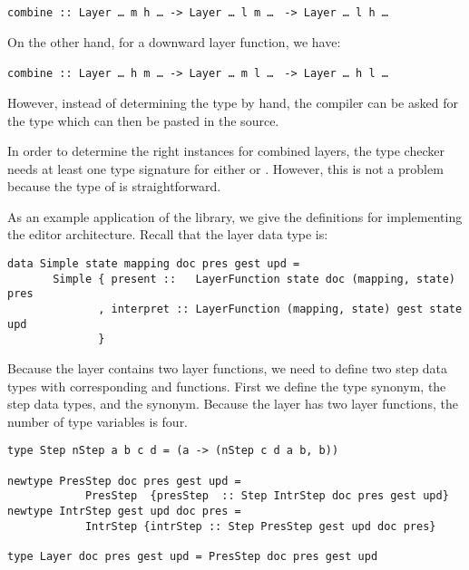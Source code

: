 \documentclass[preprint,natbib]{sigplanconf}
\begin{document}
\begin{small}
{\tt  combine :: Layer \dots~m h \dots}\verb| -> |{\tt Layer \dots~l m \dots} \verb| -> |{\tt Layer \dots~l h \dots}
\end{small}

On the other hand, for a downward layer function, we have:

\begin{small}
{\tt  combine :: Layer \dots~h m \dots}\verb| -> |{\tt Layer \dots~m l \dots} \verb| -> |{\tt Layer \dots~h l \dots}
\end{small}

However, instead of determining the type by hand, the compiler can be asked for the type which can then be pasted in the source.

In order to determine the right  instances for combined layers, the type checker needs at least one type signature for either  or . However, this is not a problem because the type of  is straightforward.


As an example application of the library, we give the definitions  for implementing the  editor architecture. Recall that the layer data type is:

\begin{small} %
\begin{verbatim}
data Simple state mapping doc pres gest upd =
       Simple { present ::   LayerFunction state doc (mapping, state) pres
              , interpret :: LayerFunction (mapping, state) gest state upd
              }
\end{verbatim}
\end{small}

Because the layer contains two layer functions, we need to define two step data types with corresponding  and  functions. First we define the  type synonym, the step data types, and the  synonym. Because the layer has two layer functions, the number of type variables is four.

\begin{small} %
\begin{verbatim}
type Step nStep a b c d = (a -> (nStep c d a b, b))

newtype PresStep doc pres gest upd = 
            PresStep  {presStep  :: Step IntrStep doc pres gest upd}
newtype IntrStep gest upd doc pres = 
            IntrStep {intrStep :: Step PresStep gest upd doc pres}

type Layer doc pres gest upd = PresStep doc pres gest upd
\end{verbatim}
\end{small}
\end{document}
